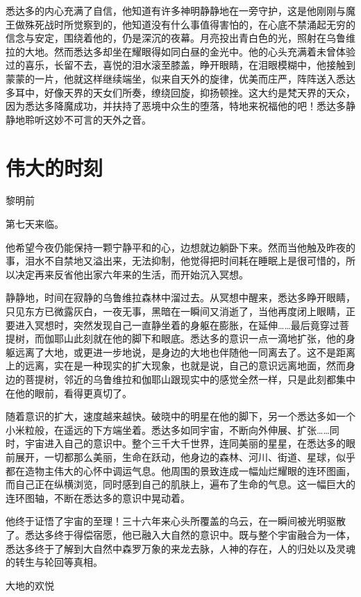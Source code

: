 \documentclass[12pt,twoside,openany]{book}
\begin{document}
悉达多的内心充满了自信，他知道有许多神明静静地在一旁守护，这是他刚刚与魔王做殊死战时所觉察到的，他知道没有什么事值得害怕的，在心底不禁涌起无穷的信念与安定，围绕着他的，仍是深沉的夜幕。月亮投出青白色的光，照射在乌鲁维拉的大地。然而悉达多却坐在耀眼得如同白昼的金光中。他的心头充满着未曾体验过的喜乐，长留不去，喜悦的泪水滚至膝盖，睁开眼睛，在泪眼模糊中，他接触到蒙蒙的一片，他就这样继续端坐，似来自天外的旋律，优美而庄严，阵阵送入悉达多耳中，好像天界的天女们所奏，缭绕回旋，抑扬顿挫。这大约是梵天界的天众，因为悉达多降魔成功，并扶持了恶境中众生的堕落，特地来祝福他的吧！悉达多静静地聆听这妙不可言的天外之音。

\section{伟大的时刻}\label{sec1.16}

黎明前

第七天来临。

他希望今夜仍能保持一颗宁静平和的心，边想就边躺卧下来。然而当他触及昨夜的事，泪水不自禁地又溢出来，无法抑制，他觉得把时间耗在睡眠上是很可惜的，所以决定再来反省他出家六年来的生活，而开始沉入冥想。

静静地，时间在寂静的乌鲁维拉森林中溜过去。从冥想中醒来，悉达多睁开眼睛，只见东方已微露灰白，一夜无事，黑暗在一瞬间又消逝了，当他再度闭上眼睛，正要进入冥想时，突然发现自己一直静坐着的身躯在膨胀，在延伸……最后竟穿过菩提树，而伽耶山此刻就在他的脚下和眼底。悉达多的意识一点一滴地扩张，他的身躯远离了大地，或更进一步地说，是身边的大地也伴随他一同离去了。这不是距离上的远离，实在是一种现实的扩大现象，也就是说，自己的意识远离地面，然而身边的菩提树，邻近的乌鲁维拉和伽耶山跟现实中的感觉全然一样，只是此刻都集中在他的眼前，看得更真切了。

随着意识的扩大，速度越来越快。破晓中的明星在他的脚下，另一个悉达多如一个小米粒般，在遥远的下方端坐着。悉达多如同宇宙，不断向外伸展、扩张……同时，宇宙进入自己的意识中。整个三千大千世界，连同美丽的星星，在悉达多的眼前展开，一切都那么美丽，生命在跃动，他身边的森林、河川、街道、星球，似乎都在造物主伟大的心怀中调运气息。他周围的景致连成一幅灿烂耀眼的连环图画，而自己正在纵横浏览，同时感到自己的肌肤上，遍布了生命的气息。这一幅巨大的连环图轴，不断在悉达多的意识中晃动着。

他终于证悟了宇宙的至理！三十六年来心头所覆盖的乌云，在一瞬间被光明驱散了。悉达多终于得偿宿愿，他已融入大自然的意识中。既与整个宇宙融合为一体，悉达多终于了解到大自然中森罗万象的来龙去脉，人神的存在，人的归处以及灵魂的转生与轮回等真相。

大地的欢悦
\end{document}
